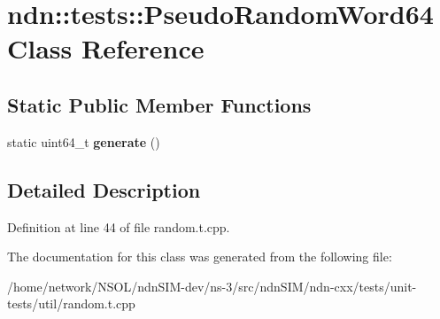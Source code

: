 \hypertarget{classndn_1_1tests_1_1PseudoRandomWord64}{}\section{ndn\+:\+:tests\+:\+:Pseudo\+Random\+Word64 Class Reference}
\label{classndn_1_1tests_1_1PseudoRandomWord64}
\subsection*{Static Public Member Functions}
\begin{DoxyCompactItemize}
\item 
static uint64\+\_\+t {\bfseries generate} ()\hypertarget{classndn_1_1tests_1_1PseudoRandomWord64_a9b5a1d8526a1ab9ec32e5aa2d6ec9a13}{}\label{classndn_1_1tests_1_1PseudoRandomWord64_a9b5a1d8526a1ab9ec32e5aa2d6ec9a13}

\end{DoxyCompactItemize}


\subsection{Detailed Description}


Definition at line 44 of file random.\+t.\+cpp.



The documentation for this class was generated from the following file\+:\begin{DoxyCompactItemize}
\item 
/home/network/\+N\+S\+O\+L/ndn\+S\+I\+M-\/dev/ns-\/3/src/ndn\+S\+I\+M/ndn-\/cxx/tests/unit-\/tests/util/random.\+t.\+cpp\end{DoxyCompactItemize}
